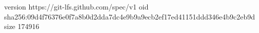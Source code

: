 version https://git-lfs.github.com/spec/v1
oid sha256:09d4f76376e0f7a8b0d2dda7dc4e9b9a9ecb2ef17ed41151ddd346e4b9c2eb9d
size 174916
